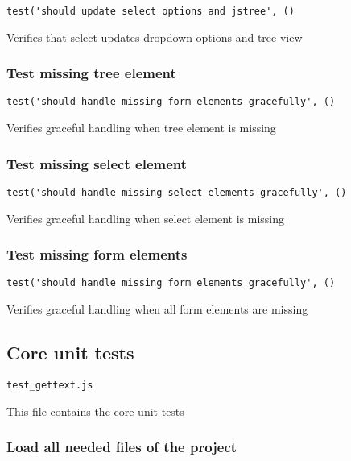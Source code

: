 \documentclass[a4paper]{article}
\begin{document}
\begin{lstlisting}
test('should update select options and jstree', ()
\end{lstlisting}

Verifies that select updates dropdown options and tree view

\hypertarget{toc176}{}
\subsubsection{Test missing tree element}

\begin{lstlisting}
test('should handle missing form elements gracefully', ()
\end{lstlisting}

Verifies graceful handling when tree element is missing

\hypertarget{toc177}{}
\subsubsection{Test missing select element}

\begin{lstlisting}
test('should handle missing select elements gracefully', ()
\end{lstlisting}

Verifies graceful handling when select element is missing

\hypertarget{toc178}{}
\subsubsection{Test missing form elements}

\begin{lstlisting}
test('should handle missing form elements gracefully', ()
\end{lstlisting}

Verifies graceful handling when all form elements are missing

\hypertarget{toc179}{}
\subsection{Core unit tests}

\begin{lstlisting}
test_gettext.js
\end{lstlisting}

This file contains the core unit tests

\hypertarget{toc180}{}
\subsubsection{Load all needed files of the project}
\end{document}
